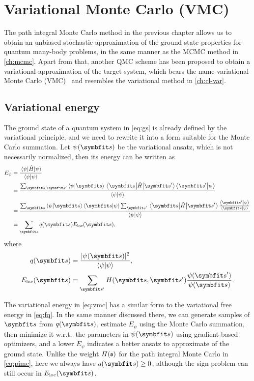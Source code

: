 \chapter{Variational Monte Carlo (VMC)}

The path integral Monte Carlo method in the previous chapter allows us to obtain an unbiased stochastic approximation of the ground state properties for quantum many-body problems, in the same manner as the MCMC method in \cref{ch:mcmc}. Apart from that, another QMC scheme has been proposed to obtain a variational approximation of the target system, which bears the name variational Monte Carlo (VMC)~\cite{scherer2017computational} and resembles the variational method in \cref{ch:cl-var}.

\section{Variational energy}

The ground state of a quantum system in \cref{eq:gs} is already defined by the variational principle, and we need to rewrite it into a form suitable for the Monte Carlo summation. Let $\psi(\vs)$ be the variational ansatz, which is not necessarily normalized, then its energy can be written as
\begin{align}
E_\psi &= \frac{\ev{\hat{H}}{\psi}}{\ip{\psi}} \\
&= \frac
{\sum_{\vs, \vs'} \ip{\psi}{\vs} \mel{\vs}{\hat{H}}{\vs'} \ip{\vs'}{\psi}}
{\ip{\psi}} \\
&= \frac
{\sum_\vs \ip{\psi}{\vs} \ip{\vs}{\psi} \sum_{\vs'} \mel{\vs}{\hat{H}}{\vs'} \frac{\ip{\vs'}{\psi}}{\ip{\vs}{\psi}}}
{\ip{\psi}} \\
&= \sum_\vs q(\vs) E_\text{loc}(\vs), \label{eq:vmc}
\end{align}
where
\begin{align}
q(\vs) &= \frac{|\psi(\vs)|^2}{\ip{\psi}}, \\
E_\text{loc}(\vs) &= \sum_{\vs'} H(\vs, \vs') \frac{\psi(\vs')}{\psi(\vs)}.
\end{align}

The variational energy in \cref{eq:vmc} has a similar form to the variational free energy in \cref{eq:fq}. In the same manner discussed there, we can generate samples of $\vs$ from $q(\vs)$, estimate $E_\psi$ using the Monte Carlo summation, then minimize it w.r.t.\ the parameters in $\psi(\vs)$ using gradient-based optimizers, and a lower $E_\psi$ indicates a better ansatz to approximate of the ground state. Unlike the weight $\varPi(\mathfrak{s})$ for the path integral Monte Carlo in \cref{eq:pimc}, here we always have $q(\vs) \ge 0$, although the sign problem can still occur in $E_\text{loc}(\vs)$.

